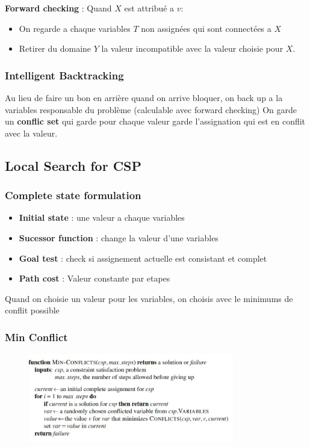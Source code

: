 			\textbf{Forward checking} : Quand $X$ est attribué a $v$:
			\begin{itemize}
				\item On regarde a chaque variables $T$ non assignées qui sont connectées a $X$
				\item Retirer du domaine $Y$ la valeur incompatible avec la valeur choisie pour $X$.
				
			\end{itemize}
		\subsubsection{Intelligent Backtracking}
			Au lieu de faire un bon en arrière quand on arrive bloquer, on back up a la variables responsable du problème (calculable avec forward checking)
			On garde un \textbf{conflic set} qui garde pour chaque valeur garde l'assignation qui est en conflit avec la valeur.
			
	\subsection{Local Search for CSP}
		\subsubsection{Complete state formulation}
			\begin{itemize}
				\item \textbf{Initial state} : une valeur a chaque variables
				\item \textbf{Sucessor function} : change la valeur d'une variables
				\item \textbf{Goal test} : check si assignement actuelle est consistant et complet
				\item \textbf{Path cost} : Valeur constante par etapes 
			\end{itemize}
			
			Quand on choisie un valeur pour les variables, on choisis avec le minimums de conflit possible
			
		\subsubsection{Min Conflict}
		
			\begin{figure}[htp]
				\centering
				\includegraphics[width=0.8\textwidth]{img/MinConflict.png}
			\end{figure}
			

